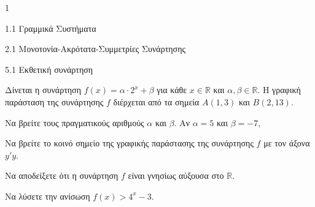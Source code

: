 \begin{ylh}{1}
\item 1.1 Γραμμικά Συστήματα
\item 2.1 Μονοτονία-Ακρότατα-Συμμετρίες Συνάρτησης
\item 5.1 Εκθετική συνάρτηση
\end{ylh}
Δίνεται η συνάρτηση $f(x) = \alpha \cdot 2^x + \beta$ για κάθε $x \in \mathbb{R}$ και $\alpha, \beta \in \mathbb{R}$. Η γραφική παράσταση της
συνάρτησης $f$ διέρχεται από τα σημεία $A(1, 3)$ και $B(2, 13)$.
\begin{alist}
\item Να βρείτε τους πραγματικούς αριθμούς $\alpha$ και $\beta$.
Αν $\alpha = 5$ και $\beta = -7$,
\item Να βρείτε το κοινό σημείο της γραφικής παράστασης της συνάρτησης $f$ με τον άξονα $y'y$.
\item Να αποδείξετε ότι η συνάρτηση $f$ είναι γνησίως αύξουσα στο $\mathbb{R}$.
\item Να λύσετε την ανίσωση $f(x) > 4^x - 3$.
\end{alist}

